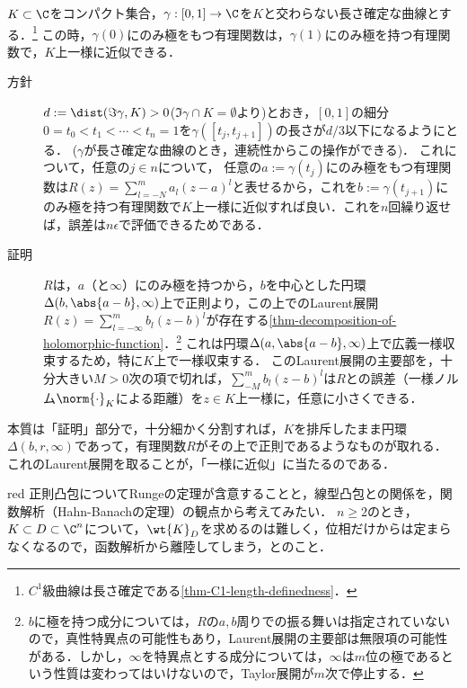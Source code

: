 \documentclass[uplatex, dvipdfmx]{jsreport}
\begin{document}
\begin{lemma}[有理式の極の曲線に沿った移動]\label{lemma-transportation-of-poles-of-rational-functions}
    $K\subset\C$をコンパクト集合，$\gamma:[0,1]\to\C$を$K$と交わらない長さ確定な曲線とする．\footnote{$C^1$級曲線は長さ確定である\ref{thm-C1-length-definedness}．}
    この時，$\gamma(0)$にのみ極をもつ有理関数は，$\gamma(1)$にのみ極を持つ有理関数で，$K$上一様に近似できる．
\end{lemma}
\begin{Proof}\mbox{}
    \begin{description}
        \item[方針] $d:=\dist(\Im\gamma,K)>0$($\Im\gamma\cap K=\emptyset$より)とおき，$[0,1]$の細分$0=t_0<t_1<\cdots<t_n=1$を$\gamma([t_j,t_{j+1}])$の長さが$d/3$以下になるようにとる．
        ($\gamma$が長さ確定な曲線のとき，連続性からこの操作ができる)．
        これについて，任意の$j\in n$について，
        任意の$a:=\gamma(t_j)$にのみ極をもつ有理関数は$R(z)=\sum_{l=-N}^ma_l(z-a)^l$と表せるから，これを$b:=\gamma(t_{j+1})$にのみ極を持つ有理関数で$K$上一様に近似すれば良い．これを$n$回繰り返せば，誤差は$n\epsilon$で評価できるためである．
        \item[証明]
        $R$は，$a$（と$\infty$）にのみ極を持つから，$b$を中心とした円環$\Delta(b,\abs{a-b},\infty)$上で正則より，この上でのLaurent展開$R(z)=\sum_{l=-\infty}^mb_l(z-b)^l$が存在する\ref{thm-decomposition-of-holomorphic-function}．\footnote{$b$に極を持つ成分については，$R$の$a,b$周りでの振る舞いは指定されていないので，真性特異点の可能性もあり，Laurent展開の主要部は無限項の可能性がある．しかし，$\infty$を特異点とする成分については，$\infty$は$m$位の極であるという性質は変わってはいけないので，Taylor展開が$m$次で停止する．}
        これは円環$\Delta(a,\abs{a-b},\infty)$上で広義一様収束するため，特に$K$上で一様収束する．
        このLaurent展開の主要部を，十分大きい$M>0$次の項で切れば，$\sum^m_{-M}b_l(z-b)^l$は$R$との誤差（一様ノルム$\norm{\cdot}_K$による距離）を$z\in K$上一様に，任意に小さくできる．
    \end{description}
\end{Proof}
\begin{remarks}
    本質は「証明」部分で，十分細かく分割すれば，$K$を排斥したまま円環$\Delta(b,r,\infty)$であって，有理関数$R$がその上で正則であるようなものが取れる．
    これのLaurent展開を取ることが，「一様に近似」に当たるのである．
\end{remarks}

\begin{tbox}{red}{}
    正則凸包についてRungeの定理が含意することと，線型凸包との関係を，関数解析（Hahn-Banachの定理）の観点から考えてみたい．
    $n\ge 2$のとき，$K\subset D\subset\C^n$について，$\wt{K}_D$を求めるのは難しく，位相だけからは定まらなくなるので，函数解析から離陸してしまう，とのこと．
\end{tbox}
\end{document}
